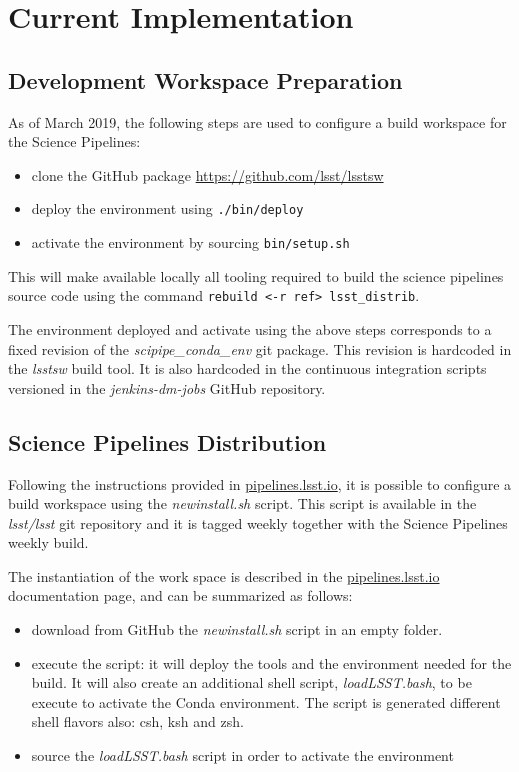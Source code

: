 \newpage
\section{Current Implementation} \label{sec:actual}

\subsection{Development Workspace Preparation} \label{sec:envset} 
As of March 2019, the following steps are used to configure a build workspace for the Science Pipelines:

\begin{itemize}
\item clone the GitHub package \url{https://github.com/lsst/lsstsw}
\item deploy the environment using \texttt{./bin/deploy}
\item activate the environment by sourcing \texttt{bin/setup.sh}
\end{itemize}

This will make available locally all tooling required to build the science pipelines source code using the command \texttt{rebuild <-r ref> lsst\_distrib}.

The environment deployed and activate using the above steps corresponds to a fixed revision of the \textit{scipipe\_conda\_env} git package.
This revision is hardcoded in the \textit{lsstsw} build tool. It is also hardcoded in the continuous integration scripts versioned in the \textit{jenkins-dm-jobs} GitHub repository.


\subsection{Science Pipelines Distribution} \label{sec:distrib}

Following the instructions provided in \url{pipelines.lsst.io}, it is possible to configure a build workspace using the \textit{newinstall.sh} script.
This script is available in the \textit{lsst/lsst} git repository and it is tagged weekly together with the Science Pipelines weekly build.

The instantiation of the work space is described in the \url{pipelines.lsst.io} documentation page, and can be summarized as follows:

\begin{itemize}
\item download from GitHub the \textit{newinstall.sh} script in an empty folder.
\item execute the script: it will deploy the tools and the environment needed for the build. It will also create an additional shell script, \textit{loadLSST.bash}, to be execute to activate the Conda environment. The script is generated different shell flavors also: csh, ksh and zsh.
\item source the \textit{loadLSST.bash} script in order to activate the environment 
\end{itemize}

